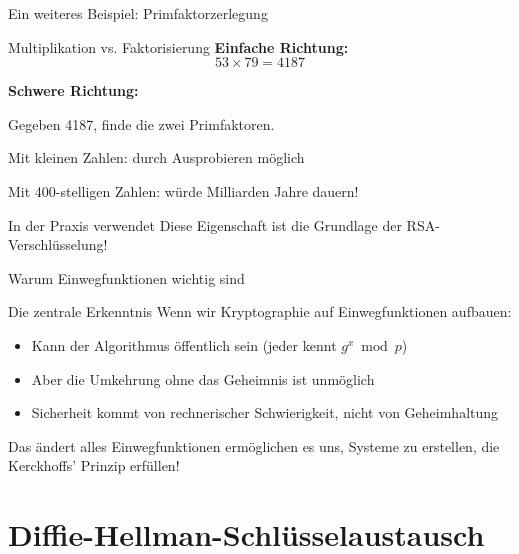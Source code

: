 \documentclass[handout]{beamer}
\begin{document}
\begin{frame}{Ein weiteres Beispiel: Primfaktorzerlegung}
\begin{block}{Multiplikation vs. Faktorisierung}
\textbf{Einfache Richtung:}
\[
53 \times 79 = 4187
\]

\pause

\textbf{Schwere Richtung:}

Gegeben 4187, finde die zwei Primfaktoren.

\pause

Mit kleinen Zahlen: durch Ausprobieren möglich

Mit 400-stelligen Zahlen: würde Milliarden Jahre dauern!
\end{block}

\pause

\begin{exampleblock}{In der Praxis verwendet}
Diese Eigenschaft ist die Grundlage der RSA-Verschlüsselung!
\end{exampleblock}
\end{frame}

\begin{frame}{Warum Einwegfunktionen wichtig sind}
\begin{block}{Die zentrale Erkenntnis}
Wenn wir Kryptographie auf Einwegfunktionen aufbauen:
\begin{itemize}
    \item Kann der Algorithmus öffentlich sein (jeder kennt $g^x \bmod p$)
    \item Aber die Umkehrung ohne das Geheimnis ist unmöglich
    \item Sicherheit kommt von rechnerischer Schwierigkeit, nicht von Geheimhaltung
\end{itemize}
\end{block}

\pause

\begin{alertblock}{Das ändert alles}
Einwegfunktionen ermöglichen es uns, Systeme zu erstellen, die Kerckhoffs' Prinzip erfüllen!
\end{alertblock}
\end{frame}

\section{Diffie-Hellman-Schlüsselaustausch}
\end{document}

